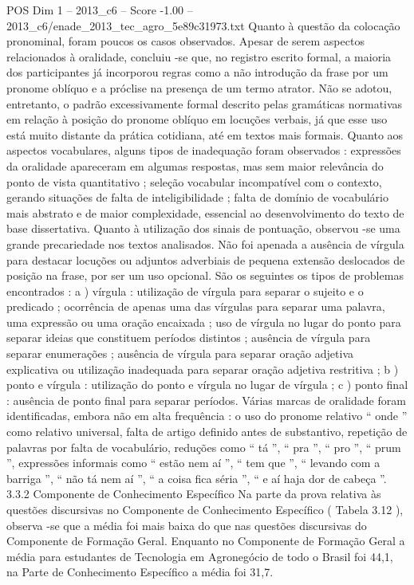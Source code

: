\begin{textsample}{POS Dim 1 – 2013\_c6 – Score -1.00 – 2013\_c6/enade\_2013\_tec\_agro\_5e89c31973.txt}
Quanto à questão da colocação pronominal, foram poucos os casos observados.
Apesar de serem aspectos relacionados à oralidade, concluiu -se que, no registro escrito formal, a maioria dos participantes já incorporou regras como a não introdução da frase por um pronome oblíquo e a próclise na presença de um termo atrator.
Não se adotou, entretanto, o padrão excessivamente formal descrito pelas gramáticas normativas em relação à posição do pronome oblíquo em locuções verbais, já que esse uso está muito distante da prática cotidiana, até em textos mais formais.
Quanto aos aspectos vocabulares, alguns tipos de inadequação foram observados : expressões da oralidade apareceram em algumas respostas, mas sem maior relevância do ponto de vista quantitativo ; seleção vocabular incompatível com o contexto, gerando situações de falta de inteligibilidade ; falta de domínio de vocabulário mais abstrato e de maior complexidade, essencial ao desenvolvimento do texto de base dissertativa.
Quanto à utilização dos sinais de pontuação, observou -se uma grande precariedade nos textos analisados.
Não foi apenada a ausência de vírgula para destacar locuções ou adjuntos adverbiais de pequena extensão deslocados de posição na frase, por ser um uso opcional.
São os seguintes os tipos de problemas encontrados : a ) vírgula : utilização de vírgula para separar o sujeito e o predicado ; ocorrência de apenas uma das vírgulas para separar uma palavra, uma expressão ou uma oração encaixada ; uso de vírgula no lugar do ponto para separar ideias que constituem períodos distintos ; ausência de vírgula para separar enumerações ; ausência de vírgula para separar oração adjetiva explicativa ou utilização inadequada para separar oração adjetiva restritiva ; b ) ponto e vírgula : utilização do ponto e vírgula no lugar de vírgula ; c ) ponto final : ausência de ponto final para separar períodos.
Várias marcas de oralidade foram identificadas, embora não em alta frequência : o uso do pronome relativo “ onde ” como relativo universal, falta de artigo definido antes de substantivo, repetição de palavras por falta de vocabulário, reduções como “ tá ”, “ pra ”, “ pro ”, “ prum ”, expressões informais como “ estão nem aí ”, “ tem que ”, “ levando com a barriga ”, “ não tá nem aí ”, “ a coisa fica séria ”, “ e aí haja dor de cabeça ”. 3.3.2 Componente de Conhecimento Específico Na parte da prova relativa às questões discursivas no Componente de Conhecimento Específico ( Tabela 3.12 ), observa -se que a média foi mais baixa do que nas questões discursivas do Componente de Formação Geral.
Enquanto no Componente de Formação Geral a média para estudantes de Tecnologia em Agronegócio de todo o Brasil foi 44,1, na Parte de Conhecimento Específico a média foi 31,7.

\end{textsample}
